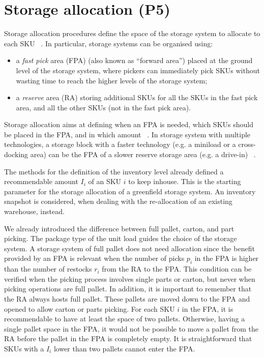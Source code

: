 \section{Storage allocation (P5)}
Storage allocation procedures define the space of the storage system to allocate to each SKU ~\cite{Bartholdi2008, Battista2014, Bottani2012, Guerriero2015, Hassini2008, VanDenBerg1998, Walter2013, Yu2015}. In particular, storage systems can be organised using:

\begin{itemize}
    \item a \textit{fast pick} area (FPA) (also known as “forward area”) placed at the ground level of the storage system, where pickers can immediately pick SKUs without wasting time to reach the higher levels of the storage system;
    \item a \textit{reserve} area (RA) storing additional SKUs for all the SKUs in the fast pick area, and all the other SKUs (not in the fast pick area).

\end{itemize}

Storage allocation aims at defining when an FPA is needed, which SKUs should be placed in the FPA, and in which amount ~\cite{Walter2013}. In storage system with multiple technologies, a storage block with a faster technology (e.g. a miniload or a cross-docking area) can be the FPA of a slower reserve storage area (e.g. a drive-in) ~\cite{Hackman1990, Li2009}.\par

The methods for the definition of the inventory level already defined a recommendable amount $I_i$ of an SKU $i$ to keep inhouse. This is the starting parameter for the storage allocation of a greenfield storage system. An inventory snapshot is considered, when dealing with the re-allocation of an existing warehouse, instead. \par

We already introduced the difference between full pallet, carton, and part picking. The package type of the unit load guides the choice of the storage system. A storage system of full pallet does not need allocation since the benefit provided by an FPA is relevant when the number of picks $p_i$ in the FPA is higher than the number of restocks $r_i$ from the RA to the FPA. This condition can be verified when the picking process involves single parts or carton, but never when picking operations are full pallet. In addition, it is important to remember that the RA always hosts full pallet. These pallets are moved down to the FPA and opened to allow carton or parts picking. For each SKU $i$ in the FPA, it is recommendable to have at least the space of two pallets. Otherwise, having a single pallet space in the FPA, it would not be possible to move a pallet from the RA before the pallet in the FPA is completely empty. It is straightforward that SKUs with a $I_i$ lower than two pallets cannot enter the FPA.

